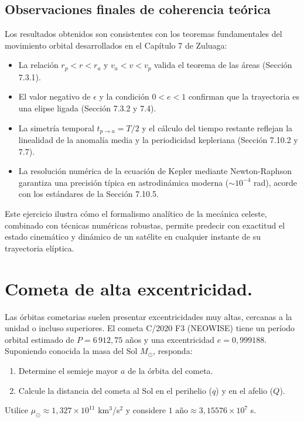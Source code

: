 \documentclass[12pt, a4paper]{article}
\begin{document}
\subsection*{Observaciones finales de coherencia teórica}
Los resultados obtenidos son consistentes con los teoremas fundamentales del movimiento orbital desarrollados en el Capítulo 7 de Zuluaga:
\begin{itemize}
    \item La relación $r_p < r < r_a$ y $v_a < v < v_p$ valida el teorema de las áreas (Sección 7.3.1).
    \item El valor negativo de $\epsilon$ y la condición $0 < e < 1$ confirman que la trayectoria es una elipse ligada (Sección 7.3.2 y 7.4).
    \item La simetría temporal $t_{p \to a} = T/2$ y el cálculo del tiempo restante reflejan la linealidad de la anomalía media y la periodicidad kepleriana (Sección 7.10.2 y 7.7).
    \item La resolución numérica de la ecuación de Kepler mediante Newton-Raphson garantiza una precisión típica en astrodinámica moderna ($\sim 10^{-4}$ rad), acorde con los estándares de la Sección 7.10.5.
\end{itemize}
Este ejercicio ilustra cómo el formalismo analítico de la mecánica celeste, combinado con técnicas numéricas robustas, permite predecir con exactitud el estado cinemático y dinámico de un satélite en cualquier instante de su trayectoria elíptica.




\section{Cometa de alta excentricidad.} Las órbitas cometarias suelen presentar excentricidades muy altas, cercanas a la unidad o incluso superiores. El cometa C/2020 F3 (NEOWISE) tiene un período orbital estimado de $P = 6\,912,75$ años y una excentricidad $e = 0,999188$. Suponiendo conocida la masa del Sol $M_{\odot}$, responda:
\begin{enumerate}
    \item[a)] Determine el semieje mayor $a$ de la órbita del cometa.
    \item[b)] Calcule la distancia del cometa al Sol en el perihelio ($q$) y en el afelio ($Q$).
\end{enumerate}
Utilice $\mu_{\odot} \approx 1,327 \times 10^{11}$ km$^3$/s$^2$ y considere $1 \text{ año} \approx 3,15576 \times 10^7$ s.
\end{document}
